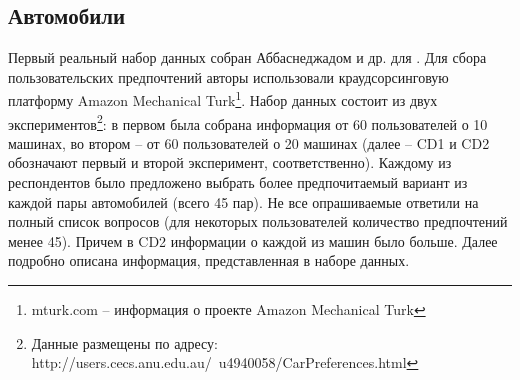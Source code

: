 	
	\subsection{Автомобили}
	\label{subsec:cars_description}
		Первый реальный набор данных собран Аббаснеджадом и др. для \cite{dataset:Abbasnejad:2013}. Для сбора пользовательских предпочтений авторы использовали краудсорсинговую платформу Amazon Mechanical Turk\footnote{mturk.com – информация о проекте Amazon Mechanical Turk}. Набор данных состоит из двух экспериментов\footnote{Данные размещены по адресу: http://users.cecs.anu.edu.au/~u4940058/CarPreferences.html}: в первом была собрана информация от 60 пользователей о 10 машинах, во втором – от 60 пользователей о 20 машинах (далее – CD1 и CD2 обозначают первый и второй эксперимент, соответственно). Каждому из респондентов было предложено выбрать более предпочитаемый вариант из каждой пары автомобилей (всего 45 пар). Не все опрашиваемые ответили на полный список вопросов (для некоторых пользователей количество предпочтений менее 45). Причем в CD2 информации о каждой из машин было больше. Далее подробно описана информация, представленная в наборе данных.
		
		\vspace{1em}
		
